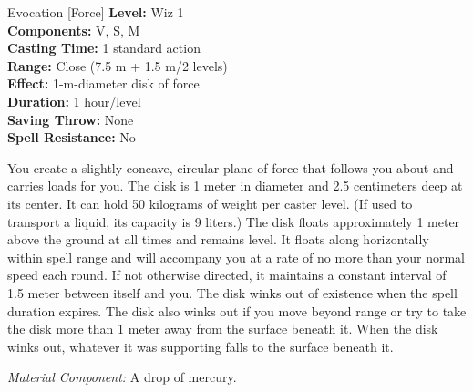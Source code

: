 {Evocation [Force]}
{
	\textbf{Level:}
	Wiz 1\\
	\textbf{Components:}
	V, S, M\\
	\textbf{Casting Time:}
	1 standard action\\
	\textbf{Range:}
	Close (7.5 m + 1.5 m/2 levels)\\
	\textbf{Effect:}
	1-m-diameter disk of force\\
	\textbf{Duration:}
	1 hour/level\\
	\textbf{Saving Throw:}
	None\\
	\textbf{Spell Resistance:}
	No\\
}
{
	You create a slightly concave, circular plane of force that follows you about and carries loads for you. The disk is 1 meter in diameter and 2.5 centimeters deep at its center. It can hold 50 kilograms of weight per caster level. (If used to transport a liquid, its capacity is 9 liters.) The disk floats approximately 1 meter above the ground at all times and remains level. It floats along horizontally within spell range and will accompany you at a rate of no more than your normal speed each round. If not otherwise directed, it maintains a constant interval of 1.5 meter between itself and you. The disk winks out of existence when the spell duration expires. The disk also winks out if you move beyond range or try to take the disk more than 1 meter away from the surface beneath it. When the disk winks out, whatever it was supporting falls to the surface beneath it.

	\textit{Material Component:}
	A drop of mercury.

}
